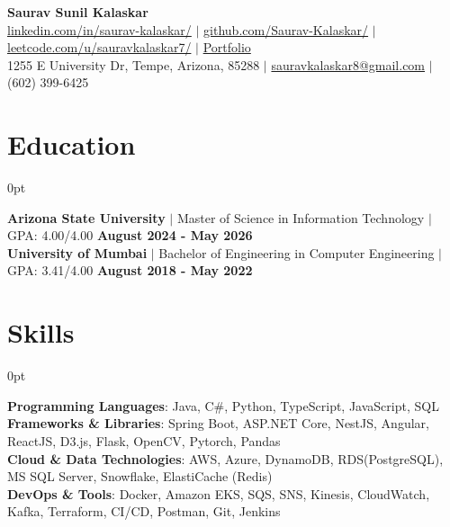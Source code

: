 \documentclass[letterpaper,10pt]{article}
\newlength{\contentindent}
\newcommand{\sectioncontent}[1]{%
  \begin{adjustwidth}{\contentindent}{0pt}%
  #1%
  \end{adjustwidth}%
}
\begin{document}
\setlength{\parindent}{0pt}
\setlength{\parskip}{0pt}
\setlength{\rightskip}{0.25em}

\begin{center}
    {\Huge \textbf{Saurav Sunil Kalaskar}}\\[2pt]
    
    \href{http://www.linkedin.com/in/saurav-kalaskar}{linkedin.com/in/saurav-kalaskar/} $|$
    \href{https://github.com/Saurav-Kalaskar}{github.com/Saurav-Kalaskar/} $|$
    \href{https://leetcode.com/u/sauravkalaskar7/}{leetcode.com/u/sauravkalaskar7/} $|$
    \href{https://www.saurav-kalaskar.me/}{Portfolio}
    \\
    1255 E University Dr, Tempe, Arizona, 85288 $|$ \href{mailto:sauravkalaskar7@gmail.com}{sauravkalaskar8@gmail.com} $|$ (602) 399-6425    
\end{center}

\section{Education}
\sectioncontent{
\textbf{Arizona State University} $|$ Master of Science in Information Technology $|$ GPA: 4.00/4.00 \hfill \textbf{August 2024 - May 2026}
\\[2pt]
\textbf{University of Mumbai} $|$ Bachelor of Engineering in Computer Engineering $|$ GPA: 3.41/4.00 \hfill \textbf{August 2018 - May 2022}
\\[2pt]
}


\section{Skills}
\sectioncontent{
\textbf{Programming Languages}: Java, C\#, Python, TypeScript, JavaScript, SQL\\
\textbf{Frameworks \& Libraries}: Spring Boot, ASP.NET Core, NestJS, Angular, ReactJS, D3.js, Flask, OpenCV, Pytorch, Pandas\\
\textbf{Cloud \& Data Technologies}: AWS, Azure, DynamoDB, RDS(PostgreSQL), MS SQL Server, Snowflake, ElastiCache (Redis)\\
\textbf{DevOps \& Tools}: Docker, Amazon EKS, SQS, SNS, Kinesis, CloudWatch, Kafka, Terraform, CI/CD, Postman, Git, Jenkins\\
}
\end{document}
